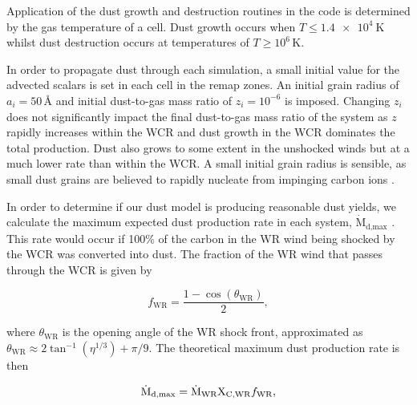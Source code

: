\documentclass[fleqn,usenatbib]{mnras}
\newcommand{\maxdust}{\ensuremath{\dot{\text{M}}_\text{d,max}}}
\newcommand{\rms}[1]{\ensuremath{_{\text{#1}}}}
\begin{document}
\noindent
Application of the dust growth and destruction routines in the code is determined by the gas temperature of a cell.
Dust growth occurs when $T \leq \SI{1.4e4}{\kelvin}$ whilst dust destruction occurs at temperatures of $T \geq 10^6 \, \si{\kelvin}$.

In order to propagate dust through each simulation, a small initial value for the advected scalars is set in each cell in the remap zones.
An initial grain radius of $a_i = 50 \, \text{\AA}$ and initial dust-to-gas mass ratio of $z_i = 10^{-6}$ is imposed.
Changing $z_i$ does not significantly impact the final dust-to-gas mass ratio of the system as $z$ rapidly increases within the WCR and dust growth in the WCR dominates the total production.
Dust also grows to some extent in the unshocked winds but at a much lower rate than within the WCR.
A small initial grain radius is sensible, as small dust grains are believed to rapidly nucleate from impinging carbon ions 
\citep{harriesThreedimensionalDustRadiativetransfer2004,zubkoPhysicalModelDust1998a}.

In order to determine if our dust model is producing reasonable dust yields, we calculate the maximum expected dust production rate in each system, $\dot{\text{M}}_\text{d,max}$ \citep{pittardCollidingStellarWinds2018}.
This rate would occur if 100\% of the carbon in the WR wind being shocked by the WCR was converted into dust.
The fraction of the WR wind that passes through the WCR is given by

\begin{equation}
	f_\text{WR} = \frac{1 - \cos \left(\theta_\text{WR}\right)}{2} ,
\end{equation}

\noindent
where $\theta_\text{WR}$ is the opening angle of the WR shock front, approximated as $\theta_\text{WR} \approx 2 \tan^{-1} ( \eta^{1/3} ) + \pi/9$.
The theoretical maximum dust production rate is then

\begin{equation}
  \label{eq:maxdust}
	\maxdust = \dot{\text{M}}_\text{WR} \text X_\text{C,WR} f_\text{WR},
\end{equation}
\end{document}

